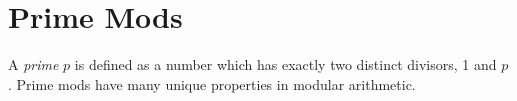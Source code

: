 \documentclass[11pt]{article}
\theoremstyle{definition}
\newcommand{\fdbox}[2]{\fbox{\sffamily\LARGE\vphantom y#1: \bfseries #2} \par\vspace{1em}} %
\begin{document}
\newcommand{\logo}{%
\begin{minipage}[b]{22em}
\centering\noindent
\\[0.5em]
\begin{minipage}[t][4em][t]{12em} \centering
{\huge \bfseries ${\bf 26^{\text{th}}}$ TJIMO } \\
\textsc{\large Alexandria, Virginia}
\end{minipage}
\end{minipage}
\vspace*{-0.05em}
}
\newcommand{\sevenpoints}{}
\newcommand{\righthead}{\fdbox{Round}{Power Solutions}}


\section{Prime Mods}
A \textit{prime} $p$ is defined as a number which has exactly two distinct divisors, 1 and $p$. Prime mods have many unique properties in modular arithmetic.
\end{document}
